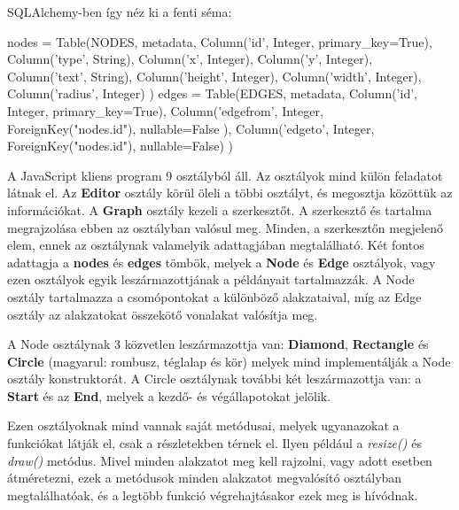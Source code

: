 SQLAlchemy-ben így néz ki a fenti séma:

\begin{python}
            nodes = Table(NODES, metadata,
                        Column('id', Integer, primary_key=True),
                        Column('type', String),
                        Column('x', Integer),
                        Column('y', Integer),
                        Column('text', String),
                        Column('height', Integer),
                        Column('width', Integer),
                        Column('radius', Integer)
                        )
            edges = Table(EDGES, metadata,
                        Column('id', Integer, primary_key=True),
                        Column('edgefrom', Integer, 
ForeignKey("nodes.id"), nullable=False ),
                        Column('edgeto', Integer, 
ForeignKey("nodes.id"), nullable=False)
                        ) 
\end{python}

\newpage

A JavaScript kliens program 9 osztályból áll. Az osztályok mind külön feladatot látnak el. Az \textbf{Editor} osztály körül öleli a többi osztályt, és megosztja közöttük az információkat. A \textbf{Graph} osztály kezeli a szerkesztőt. A szerkesztő és tartalma megrajzolása ebben az osztályban valósul meg. Minden, a szerkesztőn megjelenő elem, ennek az osztálynak valamelyik adattagjában megtalálható. Két fontos adattagja a \textbf{nodes} és \textbf{edges} tömbök, melyek a \textbf{Node} és \textbf{Edge} osztályok, vagy ezen osztályok egyik leszármazottjának a példányait tartalmazzák. A Node osztály tartalmazza a csomópontokat a különböző alakzataival, míg az Edge osztály az alakzatokat összekötő vonalakat valósítja meg.
 
A Node osztálynak 3 közvetlen leszármazottja van: \textbf{Diamond}, \textbf{Rectangle} és \textbf{Circle} (magyarul: rombusz, téglalap és kör) melyek mind implementálják a Node osztály konstruktorát. A Circle osztálynak további két leszármazottja van: a \textbf{Start} és az \textbf{End}, melyek a kezdő- és végállapotokat jelölik.

Ezen osztályoknak mind vannak saját metódusai, melyek ugyanazokat a funkciókat látják el, csak a részletekben térnek el. Ilyen például a \textit{resize()} és \textit{draw()} metódus. Mivel minden alakzatot meg kell rajzolni, vagy adott esetben átméretezni, ezek a metódusok minden alakzatot megvalósító osztályban megtalálhatóak, és a legtöbb funkció végrehajtásakor ezek meg is hívódnak.
 
